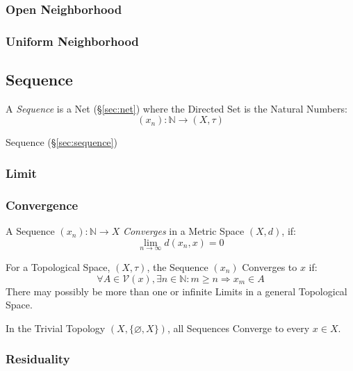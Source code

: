 \subsubsection{Open Neighborhood}\label{sec:open_neighborhood}

\subsubsection{Uniform Neighborhood}\label{sec:uniform_neighborhood}



\subsection{Sequence}\label{sec:sequence_topology}

A \emph{Sequence} is a Net (\S\ref{sec:net}) where the Directed Set is
the Natural Numbers:
\[
  (x_n) : \mathbb{N} \rightarrow (X,\tau)
\]

Sequence (\S\ref{sec:sequence})



\subsubsection{Limit}\label{sec:limit_topology}

\subsubsection{Convergence}\label{sec:convergence_topology}

A Sequence $(x_n) : \mathbb{N} \rightarrow X$
\emph{Converges} in a Metric Space $(X,d)$, if:
\[
  \lim_{n \rightarrow \infty} d (x_n, x) = 0
\]

For a Topological Space, $(X,\tau)$, the Sequence $(x_n)$ Converges to
$x$ if:
\[
  \forall A \in \mathcal{V}(x), \exists n \in \mathbb{N}
  : m \geq n \Rightarrow x_m \in A
\]
There may possibly be more than one or infinite Limits in a general
Topological Space.

In the Trivial Topology $(X, \{\varnothing, X\})$, all Sequences
Converge to every $x \in X$.



\subsubsection{Residuality}\label{sec:reside}

